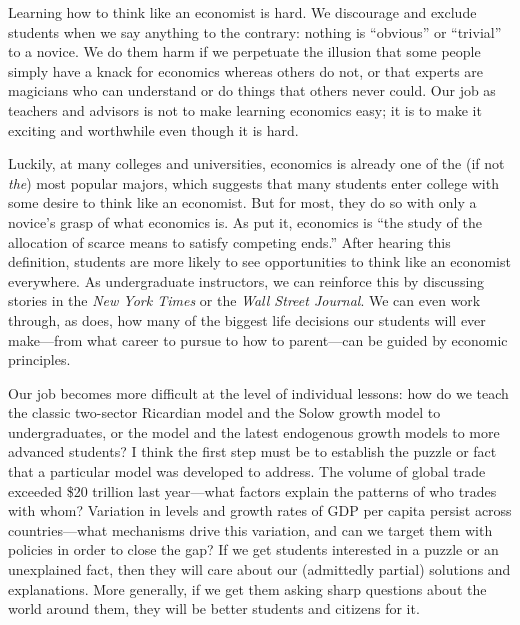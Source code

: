 \documentclass{jmstatement}
\begin{document}
\pagestyle{fancy}
\fancyhf{}
\fancyhead[L]{\bfseries\scshape \myname}
\fancyfoot[C]{\thepage}





Learning how to think like an economist is hard.
We discourage and exclude students when we say anything to the contrary:
nothing is ``obvious'' or ``trivial'' to a novice.
We do them harm if we perpetuate the illusion that some people simply have a
knack for economics whereas others do not, or that experts are magicians who
can understand or do things that others never could.
Our job as teachers and advisors is not to make learning economics easy;
it is to make it exciting and worthwhile even though it is hard.

Luckily, at many colleges and universities, economics is already one of the
(if not \textit{the}) most popular majors, which suggests that many students
enter college with some desire to think like an economist.
But for most, they do so with only a novice's grasp of what economics is.
As \citet{Becker1971} put it, economics is ``the study of the allocation of
scarce means to satisfy competing ends.''
After hearing this definition, students are more likely to see opportunities
to think like an economist everywhere.
As undergraduate instructors, we can reinforce this by discussing stories in
the \textit{New York Times} or the \textit{Wall Street Journal}.
We can even work through, as \citet{Michael2016} does, how many of the biggest
life decisions our students will ever make---from what career to pursue to how
to parent---can be guided by economic principles.

Our job becomes more difficult at the level of individual lessons:
how do we teach the classic two-sector Ricardian model and the Solow growth model
to undergraduates, or the \citet{EatonKortum2002} model and the latest endogenous
growth models to more advanced students?
I think the first step must be to establish the puzzle or fact that a particular
model was developed to address.
The volume of global trade exceeded \$20 trillion last year---what factors explain
the patterns of who trades with whom?
Variation in levels and growth rates of GDP per capita persist across countries---what
mechanisms drive this variation, and can we target them with policies in order
to close the gap?
If we get students interested in a puzzle or an unexplained fact,
then they will care about our (admittedly partial) solutions and explanations.
More generally, if we get them asking sharp questions about the world around them,
they will be better students and citizens for it.
\end{document}
